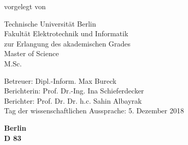 \makeatletter

\vspace{1cm}

\begin{center}
{\huge\bf\@title}

\vspace{3cm}

{\large
	vorgelegt von \\
	{\Large\bf\@author}
}

\vspace{3cm}

{
Technische Universit\"{a}t Berlin \\
Fakult\"{a}t Elektrotechnik und Informatik \\
\medskip
zur Erlangung des akademischen Grades \\ 
Master of Science \\
M.Sc.
}
\end{center}

\vspace{2cm}

\begin{flushleft}
{
Betreuer: Dipl.-Inform. Max Bureck\\
Berichterin: Prof. Dr.-Ing. Ina Schieferdecker\\ 
Berichter: Prof. Dr. Dr. h.c. Sahin Albayrak\\ 
}
\medskip
Tag der wissenschaftlichen Aussprache: 5. Dezember 2018
\end{flushleft}

\vspace{2cm}

\begin{center}
{\large\bf
    Berlin \the\year \\
    \medskip
    D 83
    \medskip
}
\end{center}

\makeatother